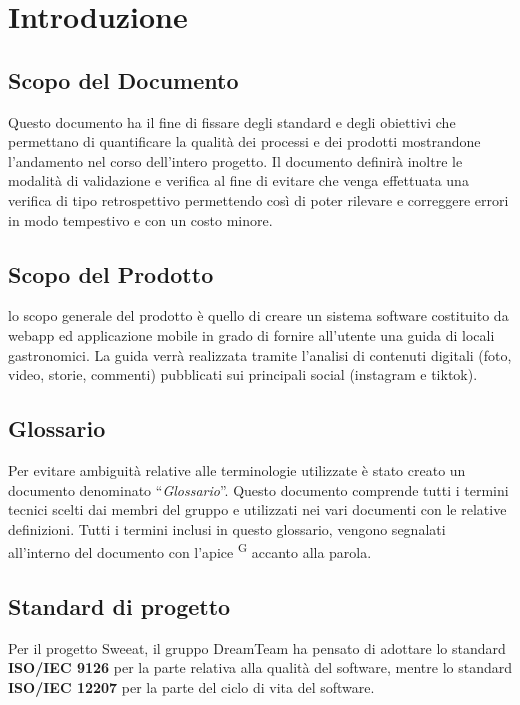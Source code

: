 \section{Introduzione}

\subsection{Scopo del Documento}
Questo documento ha il fine di fissare degli standard e degli obiettivi che permettano di quantificare la qualità dei processi e dei prodotti mostrandone l’andamento nel corso dell’intero progetto.
Il documento definirà inoltre le modalità di validazione e verifica al fine di evitare che venga effettuata una verifica di tipo retrospettivo permettendo così di poter rilevare e correggere errori in modo tempestivo e con un costo minore.


\subsection{Scopo del Prodotto}

lo scopo generale del prodotto è quello di creare un sistema software costituito da webapp ed applicazione mobile in grado di fornire all’utente una guida di locali gastronomici. La guida verrà realizzata tramite l’analisi di contenuti digitali (foto, video, storie, commenti) pubblicati sui principali social (instagram e tiktok).  
\subsection{Glossario}

Per evitare ambiguità relative alle terminologie utilizzate è stato creato un documento denominato “\textit{Glossario}”. Questo documento comprende tutti i termini tecnici scelti dai membri del gruppo e utilizzati nei vari documenti con le relative definizioni. Tutti i termini inclusi in questo glossario, vengono segnalati all’interno del documento con l’apice \textsuperscript{G} accanto alla parola.

\subsection{Standard di progetto}
Per il progetto Sweeat, il gruppo DreamTeam ha pensato di adottare lo standard \textbf{ISO/IEC 9126} per la parte relativa alla qualità del software, mentre lo standard \textbf{ISO/IEC 12207} per la parte del ciclo di vita del software.

